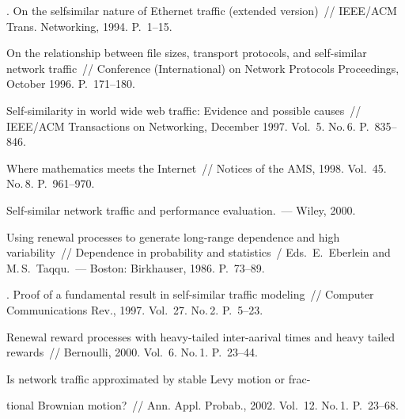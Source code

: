\begin{multicols}{2}
\vspace*{-12pt}

{\small\frenchspacing
{%
\begin{thebibliography}{99}

. On the selfsimilar
nature of Ethernet traffic (extended version)~// IEEE/ACM
Trans. Networking, 1994. P.~1--15. 

On the relationship between file sizes, transport protocols, and self-similar 
network traffic~//  Conference (International) on Network Protocols Proceedings, October 1996. 
P.~171--180. 

 Self-similarity in world wide web traffic: Evidence 
and possible  causes~// IEEE/ACM Transactions on Networking, December 1997. Vol.~5. No.\,6. 
P.~835--846. 


 Where mathematics meets the Internet~// Notices of the AMS, 1998. 
Vol.~45. No.\,8. P.~961--970.  

 Self-similar network traffic and performance 
evaluation.~--- Wiley, 2000. 

 Using renewal processes to
generate long-range dependence and high variability~// 
Dependence in probability and statistics~/
Eds.\ E.~Eberlein and M.\,S.~Taqqu.~---  Boston: Birkhauser, 1986.  P.~73--89. 

. Proof of a
fundamental result in self-similar traffic modeling~// Computer Communications
Rev., 1997. Vol.~27. No.\,2. P.~5--23. 

 Renewal reward processes with
heavy-tailed inter-aarival times and heavy tailed rewards~// Bernoulli, 2000. Vol.~6. No.\,1. 
P.~23--44. 

 Is network
traffic approximated by stable Levy motion or frac-\linebreak\vspace*{-12pt}

\columnbreak

\noindent
tional Brownian motion?~//
Ann. Appl. Probab., 2002. Vol.~12. No.\,1. P.~23--68. 


\end{thebibliography}}}
\end{multicols}
